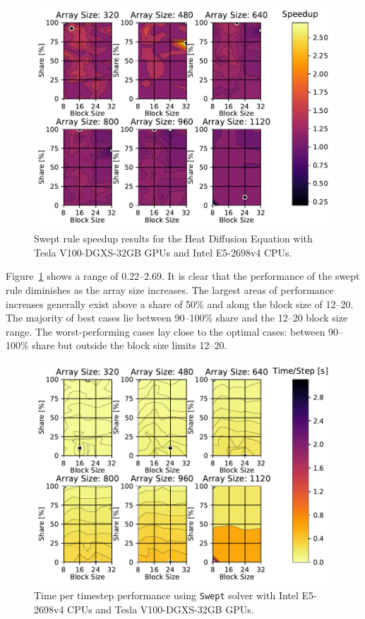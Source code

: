 \documentclass[mca,article,submit,moreauthors,pdftex]{Definitions/mdpi}
\def\Swept{\texttt{Swept}}
\def\newCPU{Intel E5-2698v4} %
\def\newGPU{Tesla V100-DGXS-32GB}
\begin{document}
\begin{figure}[htbp]
    \widefigure
    \includegraphics[scale=0.85]{figs/SpeedupTPTheatNew.pdf}
    \caption{Swept rule speedup results for the Heat Diffusion Equation with \newGPU{} GPUs and \newCPU{} CPUs.}
    \label{fig:newSpeedupHeat}
\end{figure}
\begin{paracol}{2}
\linenumbers
\switchcolumn

Figure~\ref{fig:newSpeedupHeat} shows a range of 0.22--2.69. 
It is clear that the performance of the swept rule diminishes as the array size increases. The largest areas of performance increases generally exist above a share of 50\% and along the block size of 12--20. The majority of best cases lie between 90--100\% share and the 12--20 block size range. 
The worst-performing cases lay close to the optimal cases: between 90--100\% share but outside the block size limits 12--20.

\end{paracol}
\nointerlineskip

\begin{figure}[htbp]
    \widefigure
    \includegraphics[scale=0.85]{figs/timePerStepSweptheatNew.pdf}
    \caption{Time per timestep performance using \Swept{} solver with \newCPU{} CPUs and \newGPU{} GPUs.}
    \label{fig:tptNewHeatSwept} 
\end{figure}
\end{document}
